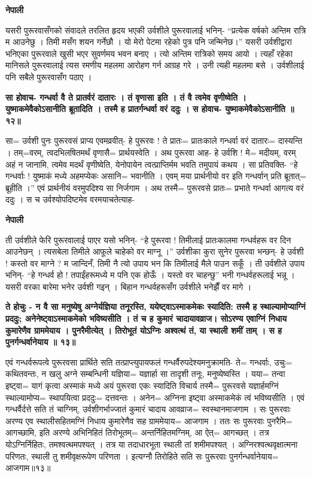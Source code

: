 \documentclass[11pt, a5paper]{article}
\begin{document}
\textbf{नेपाली}

यसरी पुरूरवासँगको संवादले तरलित हृदय भएकी उर्वशीले पुरूरवालाई भनिन्- “प्रत्येक वर्षको अन्तिम रात्रि म आउनेछु । तिमी मसँग शयन गर्नेछौ । यो मेरो पेटमा रहेको पुत्र पनि जन्मिनेछ।” यसरी उर्वशीद्वारा भनिएका पुरूरवाले खुसी भएर सुवर्णमय भवन बनाए । त्यो अन्तिम रात्रिको समय आयो । त्यहाँ रहेका मानिसले पुरूरवालाई त्यस रमणीय महलमा आरोहण गर्न आग्रह गरे । उनी त्यही महलमा बसे । उर्वशीलाई पनि सबैले पुरूरवासँग पठाए ।

\textbf{सा होवाच- गन्धर्वा वै ते प्रातर्वरं दातारः । तं वृणासा इति । तं वै त्वमेव वृणीष्वेति । युष्माकमेवैकोऽसानीति ब्रूतादिति । तस्मै ह प्रातर्गन्धर्वा वरं ददुः । स होवाच- युष्माकमेवैकोऽसानीति ॥ १२॥}

सा= उर्वशी पुनः पुरूरवसं प्राप्य एवमव्रवीत्-  हे पुरूरवः ! ते प्रातः= प्रातःकाले गन्धर्वा वरं दातारः= दास्यन्ति । तम्=वरम्, त्वदभिलषितमर्थं वृणासै= प्रार्थयस्वेति । अथ पुरूरवा आह- हे उर्वशि ! मे= मदीयम्, वरम् अहं न जानामि, त्वमेव मदर्थं वृणीष्वेति, येनोपायेन त्वत्प्राप्तिर्मम भवति तमुपायं कथय । सा प्रतिवक्ति- “हे गन्धर्वाः ! युष्माकं मध्ये अहमप्येकः असानि= भवानीति । एवम् मया प्रार्थनीयो वर इति गन्धर्वान् प्रति ब्रूतात्= ब्रूहीति ।” एवं प्रार्थनीयं वरमुपदिश्य सा निर्जगाम । अथ तस्मै= पुरूरवसे प्रातः= प्रभाते गन्धर्वा आगत्य वरं ददुः । स च उर्वश्योपदिष्टमेव वरमयाचतेत्याह-

\textbf{नेपाली}

ती उर्वशीले फेरि पुरूरवालाई पाएर यसो भनिन्- “हे पुरूरवा ! तिमीलाई प्रातःकालमा गन्धर्वहरू वर दिन आउनेछन् । त्यसबेला तिमीले आफूले चाहेको वर माग्नू ।” उर्वशीका कुरा सुनेर पुरूरवा भन्छन्- हे उर्वशी ! कस्तो वर माग्ने ? म जान्दिनँ, तिमी नै त्यो उपाय भन कि तिमीलाई मैले पाउन सकूँ । ती उर्वशीले उपाय भनिन्- “हे गन्धर्व हो ! तपाईंहरूमध्ये म पनि एक होऊँ । यस्तो वर चाहन्छु” भनी गन्धर्वहरूलाई भन्नू । यसरी वरका बारेमा भनेर उर्वशी गइन् । बिहान गन्धर्वहरूसँग उर्वशीले भनेझैँ वर मागे ।

\textbf{ते होचुः - न वै सा मनुष्येषु अग्नेर्यज्ञिया तनूरस्ति, ययेष्ट्‌वाऽस्माकमेकः स्यादिति: तस्मै ह स्थाल्यामोप्याग्निं प्रददुः; अनेनेष्ट्‌वाऽस्माकमेको भविष्यसीति । तं च ह कुमारं चादायावव्राज। सोऽरण्य एवाग्निं निधाय कुमारेणैव ग्राममेयाय । पुनरैमीत्येत् । तिरोभूतं योऽग्निः अश्वत्थं तं, या स्थाली शमीं ताम् । स ह पुनर्गन्धर्वानेयाय ॥ १३॥}

एवं गन्धर्वरूपत्वे पुरूरवसा प्रार्थिते सति तत्प्राप्त्युपायफलं गन्धर्वैरुपदेश्यमनुक्रामति-  ते= गन्धर्वाः, उचुः= कथितवन्तः, न खलु अग्ने सम्बन्धिनी यज्ञिया= यज्ञार्हा सा तादृशी तनूः, मनुष्येष्वस्ति । यया= तन्वा इष्ट्‌वा= यागं कृत्वा अस्माकं मध्ये अयं पुरूरवा एकः स्यादिति विचार्य तस्मै= पुरूरवसे यज्ञार्हमग्निं स्थाल्यामोप्य= स्थापयित्वा प्रददुः= दत्तवन्तः । अनेन= अग्निना इष्ट्‌वा अस्माकमेकं त्वं भविष्यसीति । एवं गन्धर्वैर्दत्ते सति तं चाग्निम्, उर्वशीगर्भाज्जातं कुमारं चादाय आवव्राज= स्वस्थानमाजगाम । सः पुरूरवाः अरण्य एव स्थालीसहितमग्निं निधाय कुमारेणैव सह ग्राममेयाय= आजगाम । ततः सः पुरूरवाः पुनरैमि= आगच्छामि, इति अरण्ये अभिनिहितं तिरोभूतम्= अन्तर्निहितमग्निम्, आ ऐत्= आगच्छत् । तत्र योऽग्निर्निहितः, तमश्वत्थमपश्यत् । तत्र या तदाधारभूता स्थाली तां शमीमपश्यत् । अग्निरश्वत्थवृक्षात्मना परिणतः, स्थाली तु शमीवृक्षरूपेण परिणता । इत्यग्नौ तिरोहिते सति सः पुरूरवाः पुनर्गन्धर्वानेयाय= आजगाम॥१३॥
\end{document}
